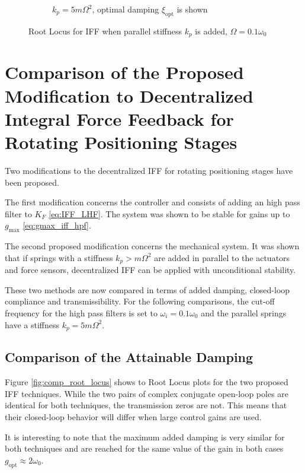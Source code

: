 \documentclass{ISMA_USD2020}
\begin{document}
\begin{figure}[htbp]
\begin{subfigure}[c]{0.49\linewidth}
\caption{\label{fig:root_locus_opt_gain_iff_kp} \(k_p = 5 m \Omega^2\), optimal damping \(\xi_\text{opt}\) is shown}
\end{subfigure}
\caption{\label{fig:root_locus_iff_kps_opt}Root Locus for IFF when parallel stiffness \(k_p\) is added, \(\Omega = 0.1 \omega_0\)}
\centering
\end{figure}

\section{Comparison of the Proposed Modification to Decentralized Integral Force Feedback for Rotating Positioning Stages}
\label{sec:org3dedf99}
\label{sec:comparison}
Two modifications to the decentralized IFF for rotating positioning stages have been proposed.

The first modification concerns the controller and consists of adding an high pass filter to \(K_F\) \eqref{eq:IFF_LHF}.
The system was shown to be stable for gains up to \(g_\text{max}\) \eqref{eq:gmax_iff_hpf}.

The second proposed modification concerns the mechanical system.
It was shown that if springs with a stiffness \(k_p > m \Omega^2\) are added in parallel to the actuators and force sensors, decentralized IFF can be applied with unconditional stability.

These two methods are now compared in terms of added damping, closed-loop compliance and transmissibility.
For the following comparisons, the cut-off frequency for the high pass filters is set to \(\omega_i = 0.1 \omega_0\) and the parallel springs have a stiffness \(k_p = 5 m \Omega^2\).
\subsection{Comparison of the Attainable Damping}
\label{sec:org173dfab}
Figure \ref{fig:comp_root_locus} shows to Root Locus plots for the two proposed IFF techniques.
While the two pairs of complex conjugate open-loop poles are identical for both techniques, the transmission zeros are not.
This means that their closed-loop behavior will differ when large control gains are used.

It is interesting to note that the maximum added damping is very similar for both techniques and are reached for the same value of the gain in both cases \(g_\text{opt} \approx 2 \omega_0\).
\end{document}
